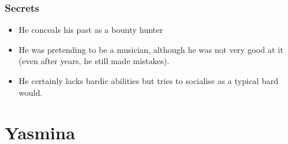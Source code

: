 \documentclass[10pt,onecolumn,twoside,openany,bg=full,layout=true]{dndbook}
\begin{document}
\subsubsection{Secrets}
  \begin{itemize}
    \item He conceals his past as a bounty hunter
    \item He was pretending to be a musician, although he was not very good at it (even after years, he still made mistakes).
    \item He certainly lacks bardic abilities but tries to socialise as a typical bard would.
  \end{itemize}

\vfill
\pagebreak


\section{Yasmina}\label{sec:yasmina}
\end{document}
